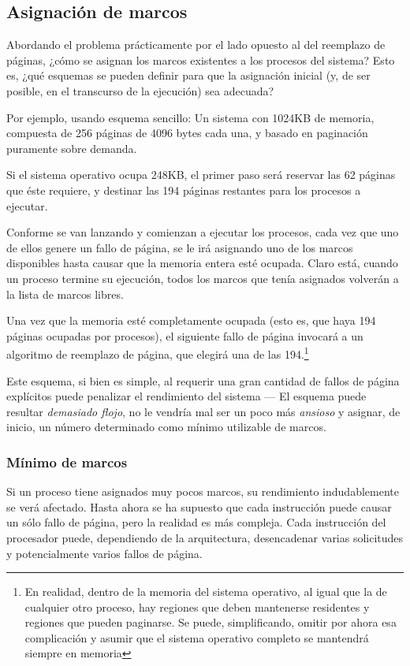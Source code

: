 \documentclass[11pt,fleqn]{book} %
\begin{document}
\subsection{Asignación de marcos}
\label{sec-5-5-4}


Abordando el problema prácticamente por el lado opuesto al del
reemplazo de páginas, ¿cómo se asignan los marcos existentes a los
procesos del sistema? Esto es, ¿qué esquemas se pueden definir para
que la asignación inicial (y, de ser posible, en el transcurso de la
ejecución) sea adecuada?

Por ejemplo, usando esquema sencillo: Un sistema con
1024KB de memoria, compuesta de 256 páginas de 4096 bytes cada una, y
basado en paginación puramente sobre demanda.

Si el sistema operativo ocupa 248KB, el primer paso será reservar las
62 páginas que éste requiere, y destinar las 194 páginas restantes
para los procesos a ejecutar.

Conforme se van lanzando y comienzan a ejecutar los procesos, cada
vez que uno de ellos genere un fallo de página, se le irá asignando
uno de los marcos disponibles hasta causar que la memoria entera esté
ocupada. Claro está, cuando un proceso termine su ejecución, todos
los marcos que tenía asignados volverán a la lista de marcos libres.

Una vez que la memoria esté completamente ocupada (esto es, que haya
194 páginas ocupadas por procesos), el siguiente fallo de página
invocará a un algoritmo de reemplazo de página, que elegirá una de las
194.\footnote{En realidad, dentro de la memoria del sistema operativo, al
igual que la de cualquier otro proceso, hay regiones que deben
mantenerse residentes y regiones que pueden paginarse. Se puede,
simplificando, omitir por ahora esa complicación y asumir que el
sistema operativo completo se mantendrá siempre en memoria }

Este esquema, si bien es simple, al requerir una gran cantidad de
fallos de página explícitos puede penalizar el rendimiento del
sistema — El esquema puede resultar \emph{demasiado flojo}, no le vendría
mal ser un poco más \emph{ansioso} y asignar, de inicio, un número
determinado como mínimo utilizable de marcos.
\subsubsection{Mínimo de marcos}
\label{sec-5-5-4-1}


Si un proceso tiene asignados muy pocos marcos, su rendimiento
indudablemente se verá afectado. Hasta ahora se ha supuesto que cada
instrucción puede causar un sólo fallo de página, pero la realidad es
más compleja. Cada instrucción del procesador puede, dependiendo de
la arquitectura, desencadenar varias solicitudes y potencialmente
varios fallos de página.
\end{document}
